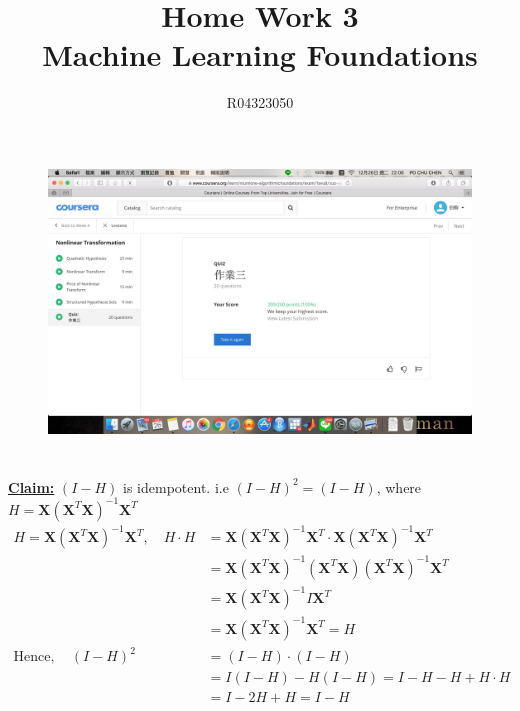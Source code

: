 \documentclass[a4paper,12pt]{article}
\title{Home Work 3\\ Machine Learning Foundations}
\author{R04323050 \\{\McQ\cH37}\z{\MbQ\cH200}\z{\MmQ\cH238}\z{\McQ\cH250}   \quad {\McQ\cH207}\z{\MdQ\cH43}\z{\MjQ\cH254}}
\date{}
\begin{document}
\maketitle
\section{}
\begin{figure}[h]
\centering
\includegraphics[scale=0.3]{Q1.png}
\end{figure}

\section{}
\textbf{\underline{Claim:}} $(I-H)$ is idempotent. i.e $(I-H)^2=(I-H)$, where $H=\mathbf{X}(\mathbf{X}^{T}\mathbf{X})^{-1}\mathbf{X}^{T}$ \\

\begin{align*} 
H=\mathbf{X}(\mathbf{X}^{T}\mathbf{X})^{-1}\mathbf{X}^{T}, \quad H \cdot H&=\mathbf{X}(\mathbf{X}^{T}\mathbf{X})^{-1}\mathbf{X}^{T} \cdot \mathbf{X}(\mathbf{X}^{T}\mathbf{X})^{-1}\mathbf{X}^{T} \\
&= \mathbf{X}(\mathbf{X}^{T}\mathbf{X})^{-1}(\mathbf{X}^{T}  \mathbf{X})(\mathbf{X}^{T}\mathbf{X})^{-1}\mathbf{X}^{T} \\
&= \mathbf{X}(\mathbf{X}^{T}\mathbf{X})^{-1} I \mathbf{X}^{T} \\
&= \mathbf{X}(\mathbf{X}^{T}\mathbf{X})^{-1} \mathbf{X}^{T} = H \\
\text{Hence},\quad  (I-H)^2 &= (I-H) \cdot (I-H) \\
&= I(I-H) - H(I-H) = I-H-H+H \cdot H \\
&= I-2H+H = I-H 
\end{align*}
\end{document}
